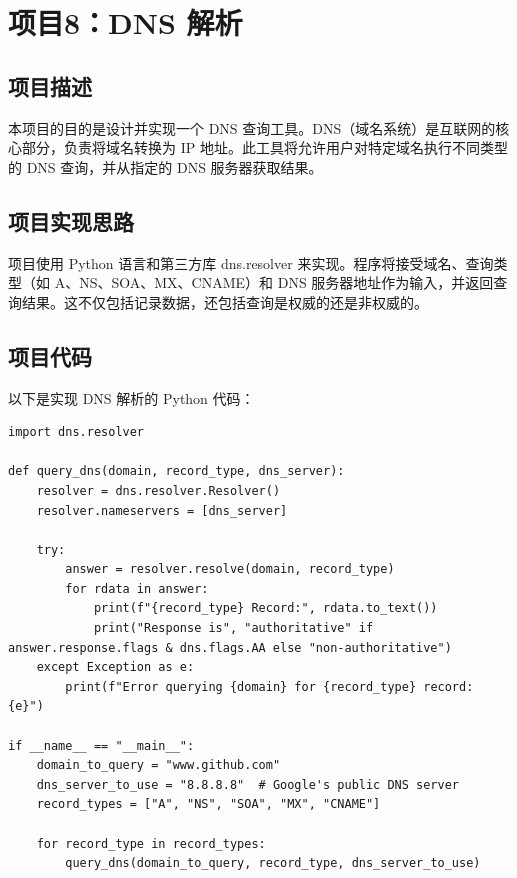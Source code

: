 \documentclass[UTF8,titlepage]{ctexart}
\numberwithin{figure}{section}
\begin{document}
\section{项目8：DNS 解析}

\subsection{项目描述}
本项目的目的是设计并实现一个 DNS 查询工具。DNS（域名系统）是互联网的核心部分，负责将域名转换为 IP 地址。此工具将允许用户对特定域名执行不同类型的 DNS 查询，并从指定的 DNS 服务器获取结果。

\subsection{项目实现思路}
项目使用 Python 语言和第三方库 dns.resolver 来实现。程序将接受域名、查询类型（如 A、NS、SOA、MX、CNAME）和 DNS 服务器地址作为输入，并返回查询结果。这不仅包括记录数据，还包括查询是权威的还是非权威的。

\subsection{项目代码}
以下是实现 DNS 解析的 Python 代码：

\begin{verbatim}
import dns.resolver

def query_dns(domain, record_type, dns_server):
    resolver = dns.resolver.Resolver()
    resolver.nameservers = [dns_server]

    try:
        answer = resolver.resolve(domain, record_type)
        for rdata in answer:
            print(f"{record_type} Record:", rdata.to_text())
            print("Response is", "authoritative" if answer.response.flags & dns.flags.AA else "non-authoritative")
    except Exception as e:
        print(f"Error querying {domain} for {record_type} record: {e}")

if __name__ == "__main__":
    domain_to_query = "www.github.com"
    dns_server_to_use = "8.8.8.8"  # Google's public DNS server
    record_types = ["A", "NS", "SOA", "MX", "CNAME"]

    for record_type in record_types:
        query_dns(domain_to_query, record_type, dns_server_to_use)
\end{verbatim}
\end{document}
